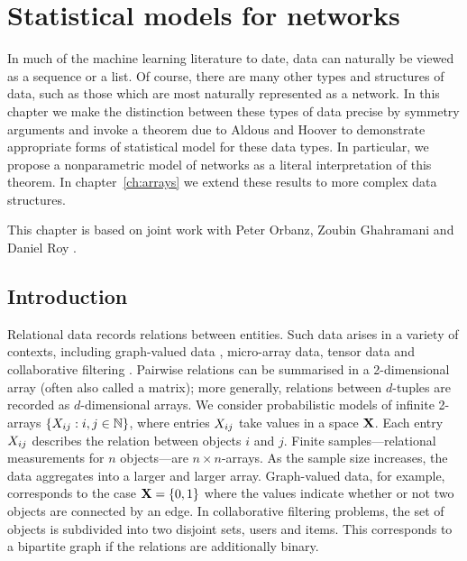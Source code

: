 
\inbpdocument

\chapter{Statistical models for networks}
\label{ch:networks}

In much of the machine learning literature to date, data can naturally be viewed as a sequence or a list.
Of course, there are many other types and structures of data, such as those which are most naturally represented as a network.
In this chapter we make the distinction between these types of data precise by symmetry arguments and invoke a theorem due to Aldous and Hoover to demonstrate appropriate forms of statistical model for these data types.
In particular, we propose a nonparametric model of networks as a literal interpretation of this theorem.
In chapter~\ref{ch:arrays} we extend these results to more complex data structures.

This chapter is based on joint work with Peter Orbanz, Zoubin Ghahramani and Daniel Roy \citep{Lloyd2012-sb}.

\section{Introduction}

Relational data records relations between entities.
Such data arises in a variety of contexts, including graph-valued data \citep[e.g.][]{Airoldi2008-fr,Hoff2002-vy}, micro-array data, tensor data \citep[e.g.][]{Xu2012-ub} and collaborative filtering \citep[e.g.][]{Salakhutdinov2008-tp}.
Pairwise relations can be summarised in a 2-dimensional array (often also called a matrix);
more generally, relations between $d$-tuples are recorded as $d$-dimensional arrays.
We consider probabilistic models of infinite 2-arrays $\{X_{ij} : i,j\in\mathbb{N}\}$, where entries $X_{ij}$ take values in a space $\mathbf{X}$. 
Each entry $X_{ij}$ describes the relation between objects $i$ and $j$. Finite
samples---relational measurements for $n$ objects---are $n\times n$-arrays. As the sample size increases, the data aggregates into
a larger and larger array. 
Graph-valued data, for example, corresponds to the case $\mathbf{X}=\lbrace{0,1}\rbrace$ where the values indicate whether or not two objects are connected by an edge.
In collaborative filtering problems, the set of objects is subdivided into two disjoint sets, \eg users and items.
This corresponds to a bipartite graph if the relations are additionally binary.

